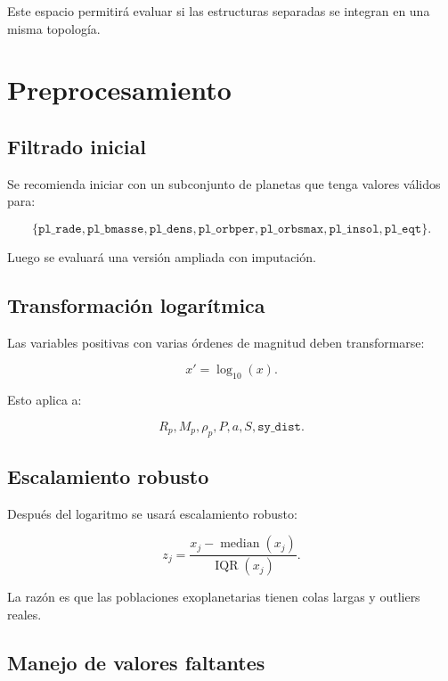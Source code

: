 \documentclass[11pt,letterpaper]{article}
\newcommand{\Rp}{R_p}
\newcommand{\Mp}{M_p}
\newcommand{\rhop}{\rho_p}
\begin{document}
Este espacio permitirá evaluar si las estructuras separadas se integran en una misma topología.

\section{Preprocesamiento}

\subsection{Filtrado inicial}

Se recomienda iniciar con un subconjunto de planetas que tenga valores válidos para:

\begin{equation}
\{\texttt{pl\_rade},\texttt{pl\_bmasse},\texttt{pl\_dens},\texttt{pl\_orbper},\texttt{pl\_orbsmax},\texttt{pl\_insol},\texttt{pl\_eqt}\}.
\end{equation}

Luego se evaluará una versión ampliada con imputación.

\subsection{Transformación logarítmica}

Las variables positivas con varias órdenes de magnitud deben transformarse:

\begin{equation}
x' = \log_{10}(x).
\end{equation}

Esto aplica a:

\begin{equation}
\Rp,\Mp,\rhop,P,a,S,\texttt{sy\_dist}.
\end{equation}

\subsection{Escalamiento robusto}

Después del logaritmo se usará escalamiento robusto:

\begin{equation}
z_j=\frac{x_j-\operatorname{median}(x_j)}{\operatorname{IQR}(x_j)}.
\end{equation}

La razón es que las poblaciones exoplanetarias tienen colas largas y outliers reales.

\subsection{Manejo de valores faltantes}
\end{document}
